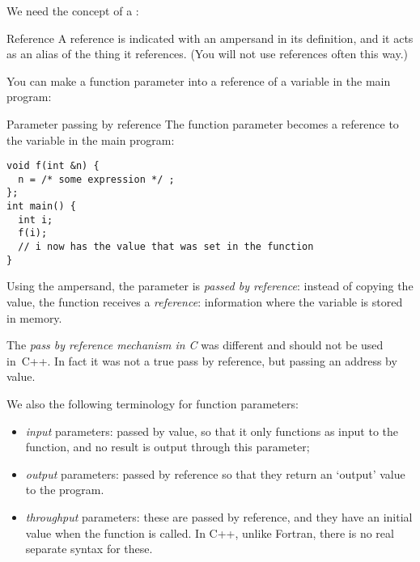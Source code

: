 We need the concept of a :
\begin{block}{Reference}
  \label{sl:cpp-reference}
  A reference is indicated with an ampersand in its definition, and it
  acts as an alias of the thing it references.
  (You will not use references often this way.)
\end{block}

You can make a function parameter into a reference of a variable in
the main program:

\begin{block}{Parameter passing by reference}
  \label{sl:pass-by-ref}
The function parameter  becomes a reference to the variable 
in the main program:
\begin{verbatim}
void f(int &n) {
  n = /* some expression */ ;
};
int main() {
  int i;
  f(i);
  // i now has the value that was set in the function
}
\end{verbatim}
\end{block}

Using the ampersand, the parameter is
\emph{passed by reference}:
instead of copying the value, the function receives a \emph{reference}:
information where the variable is stored in memory.

\begin{remark}
  The \emph{pass by reference mechanism in C}%
  was different and should not be used in~C++. In fact it was not a
  true pass by reference, but passing an address by value.
\end{remark}

We also the following terminology for function parameters:
\begin{itemize}
\item \emph{input} parameters: passed by
  value, so that it only functions as input to the function, and no
  result is output through this parameter;
\item \emph{output} parameters: passed
  by reference so that they return an `output' value to the program.
\item \emph{throughput} parameters:
  these are passed by reference, and they have an initial value when
  the function is called. In C++, unlike Fortran, there is no real
  separate syntax for these.
\end{itemize}

